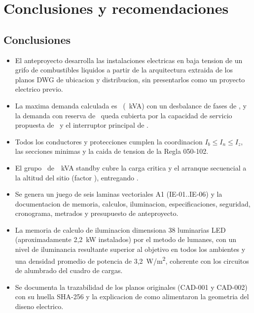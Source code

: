 \chapter{Conclusiones y recomendaciones}

\section{Conclusiones}
\begin{itemize}
\item El anteproyecto desarrolla las instalaciones electricas en baja tension
  de un grifo de combustibles liquidos a partir de la arquitectura extraida de
  los planos DWG de ubicacion y distribucion, sin presentarlos como un
  proyecto electrico previo.
\item La maxima demanda calculada es \MD~(\MDkva~kVA) con un desbalance de
  fases de \Desb, y la demanda con reserva de \MDReserva~queda cubierta por la
  capacidad de servicio propuesta de \ServCap~y el interruptor principal de
  \IPrincipal.
\item Todos los conductores y protecciones cumplen la coordinacion
  \(I_b \leq I_n \leq I_z\), las secciones minimas y la caida de tension de la
  Regla 050-102.
\item El grupo \GrupoModelo~de~\GrupoNom~kVA standby cubre la carga critica y
  el arranque secuencial a la altitud del sitio (factor \AltFactor), entregando
  \GrupoDisp.
\item Se genera un juego de seis laminas vectoriales A1 (IE-01..IE-06) y la
  documentacion de memoria, calculos, iluminacion, especificaciones, seguridad,
  cronograma, metrados y presupuesto de anteproyecto.
\item La memoria de calculo de iluminacion dimensiona 38 luminarias LED
  (aproximadamente 2,2~kW instalados) por el metodo de lumanes, con un nivel de
  iluminancia resultante superior al objetivo en todos los ambientes y una
  densidad promedio de potencia de 3,2~W/m\textsuperscript{2}, coherente con
  los circuitos de alumbrado del cuadro de cargas.
\item Se documenta la trazabilidad de los planos originales (CAD-001 y CAD-002)
  con su huella SHA-256 y la explicacion de como alimentaron la geometria del
  diseno electrico.
\end{itemize}

